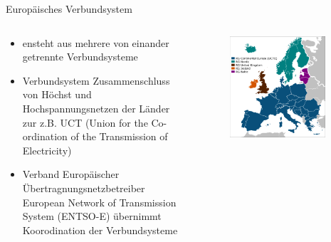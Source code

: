 \documentclass[aspectratio=1610, professionalfonts, 9pt]{beamer}
\begin{document}
{
\begin{frame}{Europäisches Verbundsystem}
\begin{columns}
\begin{column}{0.5\textwidth}
\begin{itemize}
  \item ensteht aus mehrere von einander getrennte Verbundsysteme
\item Verbundsystem
Zusammenschluss von Höchst und Hochspannungsnetzen der Länder zur z.B. UCT  (Union for the Co-ordination of the Transmission of Electricity)
  \item Verband Europäischer Übertragnungsnetzbetreiber
   European Network of Transmission System (ENTSO-E) übernimmt Koorodination
der Verbundsysteme
\end{itemize}
\end{column}
\begin{column}{0.5\textwidth}
    \begin{figure}
\includegraphics[width=0.9\textwidth]{images/Euronetz.png}
\end{figure}
\end{column}
\end{columns}
\end{frame}
}
\end{document}

